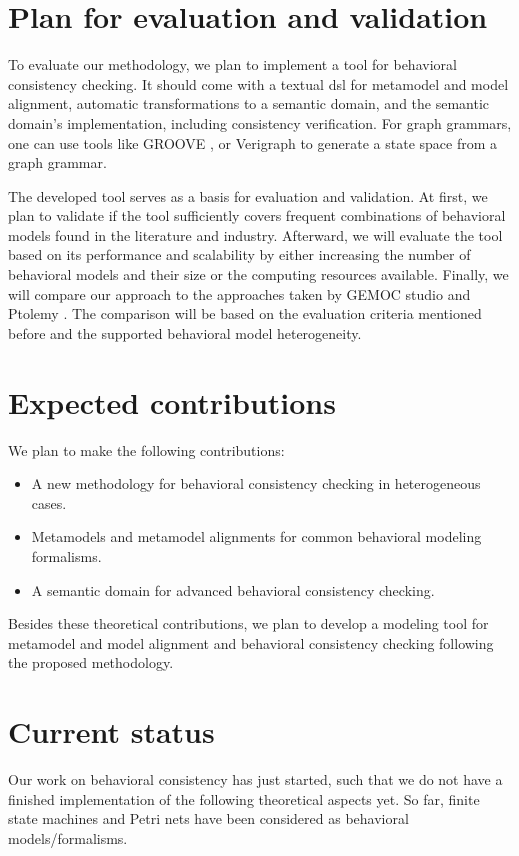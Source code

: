 \documentclass[conference]{IEEEtran}
\begin{document}
\section{Plan for evaluation and validation}
To evaluate our methodology, we plan to implement a tool for behavioral consistency checking.
It should come with a textual \gls{dsl} for metamodel and model alignment, automatic transformations to a semantic domain, and the semantic domain's implementation, including consistency verification.
For graph grammars, one can use tools like GROOVE \cite{ghamarianModellingAnalysisUsing2012, rensinkGROOVESimulatorTool2004}, or Verigraph \cite{costaVerigraphSystemSpecification2016} to generate a state space from a graph grammar.

The developed tool serves as a basis for evaluation and validation.
At first, we plan to validate if the tool sufficiently covers frequent combinations of behavioral models found in the literature and industry.
Afterward, we will evaluate the tool based on its performance and scalability by either increasing the number of behavioral models and their size or the computing resources available.
Finally, we will compare our approach to the approaches taken by GEMOC studio \cite{deantoniModelingBehavioralSemantics2016} and Ptolemy \cite{ekerTamingHeterogeneityPtolemy2003}.
The comparison will be based on the evaluation criteria mentioned before and the supported behavioral model heterogeneity.

\section{Expected contributions}
We plan to make the following contributions:
\begin{itemize}
    \item A new methodology for behavioral consistency checking in heterogeneous cases.
    \item Metamodels and metamodel alignments for common behavioral modeling formalisms.
    \item A semantic domain for advanced behavioral consistency checking.
\end{itemize}
Besides these theoretical contributions, we plan to develop a modeling tool for metamodel and model alignment and behavioral consistency checking following the proposed methodology.

\section{Current status} \label{sec:currentStatus}
Our work on behavioral consistency has just started, such that we do not have a finished implementation of the following theoretical aspects yet.
So far, finite state machines and Petri nets have been considered as behavioral models/formalisms.
\end{document}
